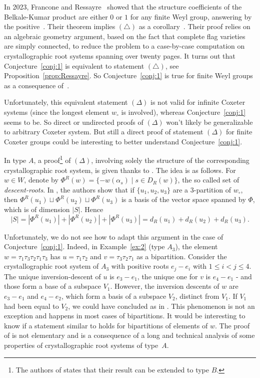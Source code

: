 \documentclass[Unicode]{cedram-alco}
\theoremstyle{definition}
\begin{document}
In 2023, Francone and Ressayre~\cite[Theorem~1]{FrRe23}  showed that the structure coefficients of the Belkale-Kumar product are either $0$ or $1$ for any finite Weyl group, answering by the positive~\cite[Claim~1]{DiRo09}. Their theorem implies  $(\triangle)$ as a corollary~\cite[Corollary~5]{FrRe23}. Their proof relies on an algebraic geometry argument, based on the fact that complete flag varieties are simply connected, to reduce the problem to a case-by-case computation on crystallographic root systems spanning over twenty pages. It turns out that Conjecture~\ref{conj:1} is equivalent to statement $(\triangle)$, see Proposition~\ref{prop:Ressayre}. So Conjecture~\ref{conj:1} is true for finite Weyl groups as a consequence of~\cite[Theorem~1]{FrRe23}. 


Unfortunately, this equivalent statement $(\Delta)$ is not valid for infinite Coxeter systems (since the longest element $w_\circ$ is involved), whereas Conjecture~\ref{conj:1} seems to be. So direct or undirected proofs of $(\Delta)$ won’t likely be generalizable to arbitrary Coxeter system. But still a direct proof of statement $(\Delta)$ for finite Coxeter groups could be interesting to better understand  Conjecture~\ref{conj:1}.

In type $A$, a proof\footnote{The authors of \cite{DeDiRo17} states that their result can be extended to type $B$.}  of $(\Delta)$, involving solely the structure of the corresponding crystallographic root system, is given thanks to \cite[Proposition 8.1]{DeDiRo17}. The idea is as follows. For $w\in W$, denote by $\Phi^R(w)=\{-w(\alpha_s)\mid s\in D_R(w)\}$, the so called set of {\em descent-roots}. In \cite[Proposition 8.1]{DeDiRo17}, the authors show that if $\{u_1,u_2,u_3\}$ are a $3$-partition of $w_\circ$, then $\Phi^R(u_1)\sqcup\Phi^R(u_2)\sqcup\Phi^R(u_3)$ is  a basis of the vector space spanned by $\Phi$, which is of dimension $|S|$. Hence 
$$
|S|=|\Phi^R(u_1)|+|\Phi^R(u_2)|+|\Phi^R(u_3)|=d_R(u_1)+d_R(u_2)+d_R(u_3).
$$

Unfortunately, we do not see how to adapt this argument in the case of Conjecture~\ref{conj:1}. Indeed, in Example~\ref{ex:2} (type $A_3$),  the element $w=\tau_1\tau_3\tau_2\tau_1\tau_3$ has  $u=\tau_1\tau_2$ and $v= \tau_3\tau_2\tau_1$ as a bipartition. Consider the crystallographic root system of $A_3$ with positive roots $e_j-e_i$ with $1\leq i<j\leq 4$. 
The unique  inversion-descent of $u$ is $e_3-e_1$, the unique one for $v$ is $e_4-e_1$ - and those form a base of a subspace $V_1$. However, the inversion descents of $w$ are $e_3-e_1$ and $e_4 - e_2$, which form a basis of a subspace $V_2$, distinct from $V_1$.  If $V_1$ had been equal to $V_2$, we could have concluded as in  \cite[Proposition 8.1]{DeDiRo17}. This phenomenon is not an exception and happens in most cases of bipartitions.
	It would be interesting to know if a statement similar to \cite[Proposition 8.1]{DeDiRo17} holds for bipartitions of elements of $w$. The proof of \cite[Proposition 8.1]{DeDiRo17} is not elementary and is a consequence of a long and technical analysis of some properties of crystallographic root systems of type~$A$.
\end{document}
